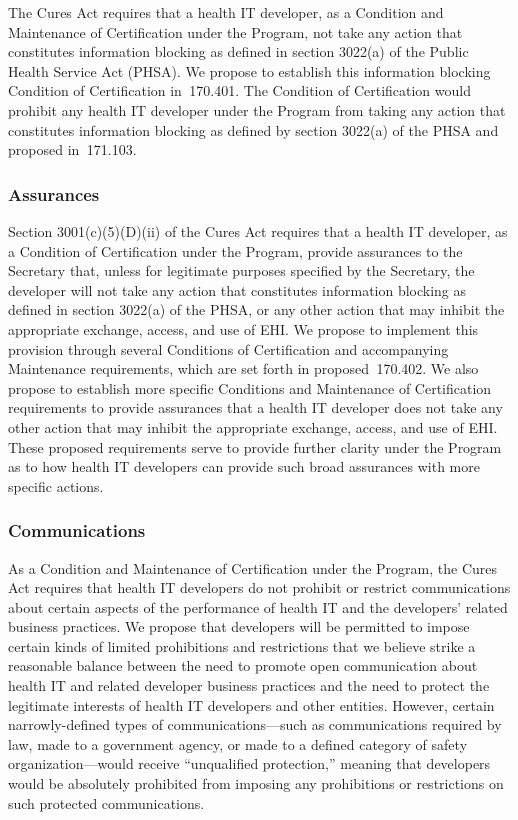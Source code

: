 \documentclass[twoside,11pt]{article}
\begin{document}
          The Cures Act requires that a health IT developer, as a Condition and Maintenance of Certification under the Program, not take any action that constitutes information blocking as defined in section 3022(a) of the Public Health Service Act (PHSA). We propose to establish this information blocking Condition of Certification in \textsection{} 170.401. The Condition of Certification would prohibit any health IT developer under the Program from taking any action that constitutes information blocking as defined by section 3022(a) of the PHSA and proposed in \textsection{} 171.103.


          \subsubsection{Assurances}

          Section 3001(c)(5)(D)(ii) of the Cures Act requires that a health IT developer, as a Condition of Certification under the Program, provide assurances to the Secretary that, unless for legitimate purposes specified by the Secretary, the developer will not take any action that constitutes information blocking as defined in section 3022(a) of the PHSA, or any other action that may inhibit the appropriate exchange, access, and use of EHI. We propose to implement this provision through several Conditions of Certification and accompanying Maintenance requirements, which are set forth in proposed \textsection{} 170.402. We also propose to establish more specific Conditions and Maintenance of Certification requirements to provide assurances that a health IT developer does not take any other action that may inhibit the appropriate exchange, access, and use of EHI. These proposed requirements serve to provide further clarity under the Program as to how health IT developers can provide such broad assurances with more specific actions.


          \subsubsection{Communications}

          As a Condition and Maintenance of Certification under the Program, the Cures Act requires that health IT developers do not prohibit or restrict communications about certain aspects of the performance of health IT and the developers' related business practices. We propose that developers will be permitted to impose certain kinds of limited prohibitions and restrictions that we believe strike a reasonable balance between the need to promote open communication about health IT and related developer business practices and the need to protect the legitimate interests of health IT developers and other entities. However, certain narrowly-defined types of communications—such as communications required by law, made to a government agency, or made to a defined category of safety organization—would receive “unqualified protection,” meaning that developers would be absolutely prohibited from imposing any prohibitions or restrictions on such protected communications.
\end{document}
